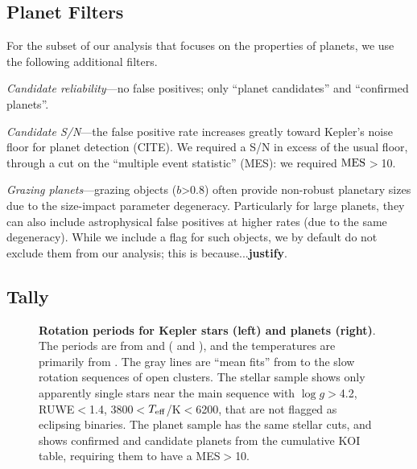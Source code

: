 \documentclass[11pt,twocolumn,tighten]{aastex63}
\begin{document}
\subsection{Planet Filters}
For the subset of our analysis that focuses on the properties of
planets, we use the following additional filters.

{\it Candidate reliability}---no false positives; only ``planet
candidates'' and ``confirmed planets''.

{\it Candidate S/N}---the false positive rate increases greatly toward
Kepler's noise floor for planet detection (CITE).  We required a S/N
in excess of the usual floor, through a cut on the ``multiple event
statistic'' (MES): we required ${\rm MES}$$>$10.

{\it Grazing planets}---grazing objects ($b$>0.8) often provide
non-robust planetary sizes due to the size-impact parameter
degeneracy.  Particularly for large planets, they can also include
astrophysical false positives at higher rates (due to the same
degeneracy).  While we include a flag for such objects, we by default
do not exclude them from our analysis; this is because...{\bf justify}.

\subsection{Tally}

\begin{figure*}[!t]
	\begin{center}
	\end{center}
	\vspace{-0.5cm}
	\caption{
    {\bf Rotation periods for Kepler stars (left) and planets (right)}.
    The periods are from \citet{Santos_2019} and \citet{Santos_2021}
    ( and ), and the
    temperatures are primarily from \citet{Berger_2020a_catalog}.  The
    gray lines are ``mean fits'' from \citet{Bouma_2023} to the slow
    rotation sequences of open clusters.  The stellar sample shows
    only apparently single stars near the main sequence with $\log
    g$$>$4.2, RUWE$<$1.4, 3800$<$$T_{\rm eff}$/K$<$6200, that are not
    flagged as eclipsing binaries.  The planet sample has the same
    stellar cuts, and shows confirmed and candidate planets from the
    cumulative KOI table, requiring them to have a MES$>$10.
	}
	\label{fig:prot_vs_teff}
\end{figure*}
\end{document}
